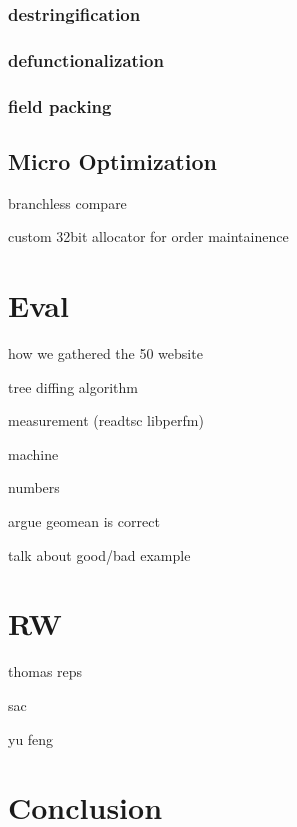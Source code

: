 \documentclass[format=acmsmall, review=false, screen=true]{acmart}
\begin{document}
\subsubsection{destringification}
\subsubsection{defunctionalization}
\subsubsection{field packing}
\subsection{Micro Optimization}
branchless compare

custom 32bit allocator for order maintainence

\section{Eval}
how we gathered the 50 website

tree diffing algorithm

measurement (readtsc libperfm)

machine

numbers

argue geomean is correct

talk about good/bad example
\section{RW}
thomas reps

sac

yu feng
\section{Conclusion}
\end{document}
